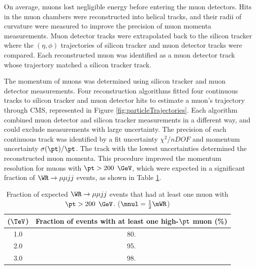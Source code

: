 On average, muons lost negligible energy before entering the muon detectors.  Hits in 
the muon chambers were reconstructed into helical tracks, and their radii of curvature were 
measured to improve the precision of muon momenta measurements.  Muon detector tracks were 
extrapolated back to the silicon tracker where the $(\eta, \phi)$ trajectories of silicon tracker 
and muon detector tracks were compared.  Each reconstructed muon was identified as a muon detector 
track whose trajectory matched a silicon tracker track.

The momentum of muons was determined using silicon tracker and muon detector measurements.  Four 
reconstruction algorithms fitted four continuous tracks \cite{cmsMuonRecoRunTwo} to silicon tracker 
and muon detector hits to estimate a muon's trajectory through CMS, represented in Figure 
\ref{fig:particleTrajectories}.  Each algorithm combined muon detector and silicon tracker measurements 
in a different way, and could exclude measurements with large uncertainty.  The precision of each 
continuous track was identified by a fit uncertainty $\chi^{2}/nDOF$ and momentum uncertainty 
$\sigma(\pt)/\pt$.  The track with the lowest uncertainties determined the reconstructed muon momenta.  
This procedure improved the momentum resolution for muons with $\pt > 200$ $\GeV$, which were 
expected in a significant fraction of $\WR \rightarrow \mu\mu jj$ events, as shown in Table 
\ref{tab:wrHighPtMuons}.

\begin{table}[h]
	\caption{Fraction of expected $\WR \rightarrow \mu\mu jj$ events that had at least one muon with $\pt > 200$ $\GeV$. 
	($\mnul = \frac{1}{2}\mWR$)}
	\label{tab:wrHighPtMuons}
	\centering
	\begin{tabular}{c|c}
		\mWR ($\TeV$) & Fraction of events with at least one high-$\pt$ muon (\%) \\  \hline
		1.0 &  80.  \\
		2.0 &  95.  \\ 
		3.0 &  98.  \\ \hline
	\end{tabular}
\end{table}


